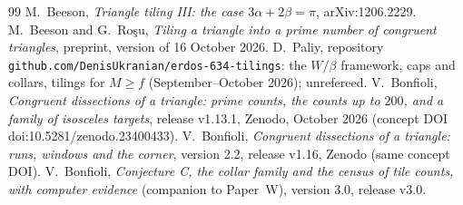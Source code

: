 \documentclass[11pt,reqno]{amsart}
\theoremstyle{plain}
\theoremstyle{definition}
\begin{document}
\begin{thebibliography}{99}
 M.~Beeson, \emph{Triangle tiling III: the case $3\alpha+2\beta=\pi$}, arXiv:1206.2229.
 M.~Beeson and G.~Ro\c{s}u, \emph{Tiling a triangle into a prime number of congruent triangles}, preprint, version of 16 October 2026.
 D.~Paliy, repository \texttt{github.com/DenisUkranian/erdos-634-tilings}: the $W/\beta$ framework, caps and collars, tilings for $M\ge f$ (September--October 2026); unrefereed.
 V.~Bonfioli, \emph{Congruent dissections of a triangle: prime counts, the counts up to $200$, and a family of isosceles targets}, release v1.13.1, Zenodo, October 2026 (concept DOI doi:10.5281/zenodo.23400433).
 V.~Bonfioli, \emph{Congruent dissections of a triangle: runs, windows and the corner}, version 2.2, release v1.16, Zenodo (same concept DOI).
 V.~Bonfioli, \emph{Conjecture C, the collar family and the census of tile counts, with computer evidence} (companion to Paper~W), version 3.0, release v3.0.
\end{thebibliography}
\end{document}
